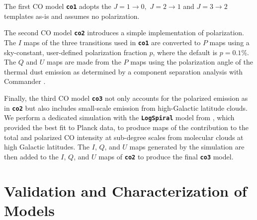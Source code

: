 \documentclass[twocolumn]{aastex631}
\begin{document}
The first CO model {\bf\texttt{co1}} adopts the $J = 1\rightarrow0,$  $J = 2\rightarrow1$ and $J = 3\rightarrow2$ templates as-is and assumes no polarization. 

The second CO model {\bf\texttt{co2}} introduces a simple implementation of polarization. The $I$ maps of the three transitions used in  {\bf\texttt{co1}} are converted to $P$ maps using a sky-constant, user-defined polarization fraction $p$, where the default is $p = 0.1$\%. The $Q$ and $U$ maps are made from the $P$ maps using the polarization angle of the thermal dust emission as determined by a component separation analysis with Commander \citep{planck2014-a12}.

Finally, the third CO model {\bf\texttt{co3}} not only accounts for the polarized emission as in {\bf\texttt{co2}} but also includes small-scale emission from high-Galactic latitude clouds. We perform a dedicated simulation with the {\bf\texttt{LogSpiral}} model from \citet{Puglisi:2017}, which provided the best fit to Planck data, to produce maps of the contribution to the total and polarized CO intensity at sub-degree scales from molecular clouds at high Galactic latitudes. The $I$, $Q$, and $U$ maps generated by the simulation are then added to the $I$, $Q$, and $U$ maps of {\bf\texttt{co2}} to produce the final {\bf\texttt{co3}} model.
 
\section{Validation and Characterization of Models} \label{sec:validation}
\end{document}
